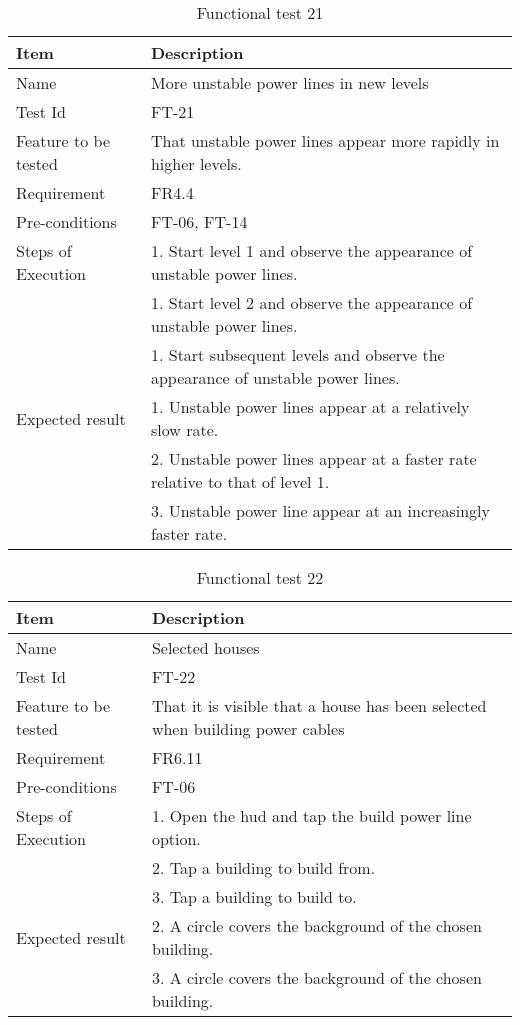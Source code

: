 \begin{table}[H]
\centering
	\begin{tabular}{ l | p{8cm} }
		\hline
		{\bf Item} & {\bf Description} \\ \hline
		Name & More unstable power lines in new levels \\ 
		Test Id & FT-21 \\ 
		Feature to be tested & That unstable power lines appear more rapidly in higher levels. \\ 
		Requirement & FR4.4 \\ 
		Pre-conditions & FT-06, FT-14\\ 
		Steps of Execution & 1. Start level 1 and observe the appearance of unstable power lines. \\
		& 1. Start level 2 and observe the appearance of unstable power lines. \\ 
		& 1. Start subsequent levels and observe the appearance of unstable power lines. \\  
		Expected result & 1. Unstable power lines appear at a relatively slow rate. \\
		& 2. Unstable power lines appear at a faster rate relative to that of level 1. \\
		& 3. Unstable power line appear at an increasingly faster rate. \\
	\end{tabular}
	\caption{Functional test 21}
\end{table}

\begin{table}[H]
\centering
	\begin{tabular}{ l | p{8cm} }
		\hline
		{\bf Item} & {\bf Description} \\ \hline
		Name & Selected houses \\ 
		Test Id & FT-22 \\ 
		Feature to be tested & That it is visible that a house has been selected when building power cables \\ 
		Requirement & FR6.11 \\ 
		Pre-conditions & FT-06 \\ 
		Steps of Execution & 1. Open the hud and tap the build power line option. \\
		& 2. Tap a building to build from. \\
		& 3. Tap a building to build to. \\
		Expected result & 2. A circle covers the background of the chosen building. \\
		& 3. A circle covers the background of the chosen building. \\
	\end{tabular}
	\caption{Functional test 22}
\end{table}

